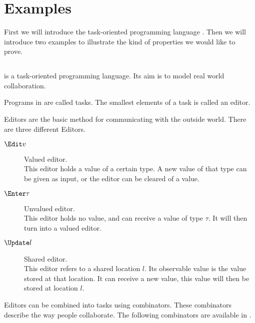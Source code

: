 

\section{Examples}
\label{sec:examples}

First we will introduce the task-oriented programming language \TOPHAT .
Then we will introduce two examples to illustrate the kind of properties we would like to prove.

\subsection{\TOPHAT}

\TOPHAT is a task-oriented programming language.
Its aim is to model real world collaboration.

Programs in \TOPHAT are called tasks.
The smallest elements of a task is called an editor.

Editors are the basic method for communicating with the outside world.
There are three different Editors.
\begin{description}
  \item[$\Edit v$] Valued editor.\\
    This editor holds a value of a certain type.
    A new value of that type can be given as input, or the editor can be cleared of a value.
  \item[$\Enter \tau$] Unvalued editor.\\
    This editor holds no value, and can receive a value of type $\tau$.
    It will then turn into a valued editor.
  \item[$\Update l$] Shared editor.\\
    This editor refers to a shared location $l$.
    Its observable value is the value stored at that location.
    It can receive a new value, this value will then be stored at location $l$.
\end{description}

Editors can be combined into tasks using combinators.
These combinators describe the way people collaborate.
The following combinators are available in \TOPHAT.

